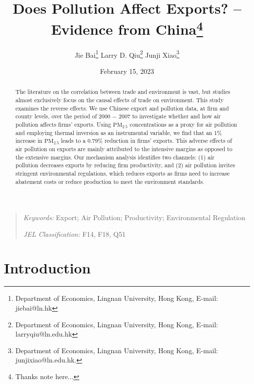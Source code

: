 \documentclass[12pt]{article}
\begin{document}
\title{Does Pollution Affect Exports? -- Evidence from China\thanks{%
Thanks note here...}}
\author{Jie Bai\thanks{%
Department of Economics, Lingnan University, Hong Kong, E-mail: jiebai@ln.hk}
\quad Larry D. Qiu\thanks{%
Department of Economics, Lingnan University, Hong Kong, E-mail:
larryqiu@ln.edu.hk} \quad Junji Xiao\thanks{%
Department of Economics, Lingnan University, Hong Kong, E-mail:
junjixiao@ln.edu.hk.}}
\date{February 15, 2023}
\maketitle

\begin{abstract}
The literature on the correlation between trade and environment is vast, but
studies almost exclusively focus on the causal effects of trade on
environment. This study examines the reverse effects. We use Chinese export
and pollution data, at firm and county levels, over the period of 2000 $-$ 2007
to investigate whether and how air pollution affects firms' exports. Using $%
\mathrm{PM_{2.5}}$ concentrations as a proxy for air pollution and employing
thermal inversion as an instrumental variable, we find that an 1\% increase
in $\mathrm{PM_{2.5}}$ leads to a 0.79\% reduction in firms' exports. This
adverse effects of air pollution on exports are mainly attributed to the
intensive margins as opposed to the extensive margins. Our mechanism
analysis identifies two channels: (1) air pollution decreases exports by
reducing firm productivity, and (2) air pollution invites stringent
environmental regulations, which reduces exports as firms need to increase
abatement costs or reduce production to meet the environment standards.
\end{abstract}

\begin{quote}
\emph{Keywords:} Export; Air Pollution; Productivity; Environmental 
Regulation 

\emph{JEL Classification:} F14, F18, Q51 
\end{quote}

\newpage  \setcounter{page}{1} 

\section{Introduction}
\end{document}
